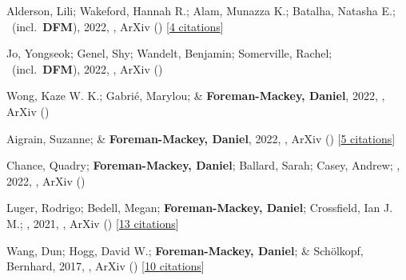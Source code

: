 \item[{\color{numcolor}\scriptsize10}] Alderson, Lili; Wakeford, Hannah R.; Alam, Munazza K.; Batalha, Natasha E.; \etal\ (incl.\ \textbf{DFM}), 2022, , ArXiv () [\href{https://ui.adsabs.harvard.edu/abs/2022arXiv221110488A}{4 citations}]

\item[{\color{numcolor}\scriptsize9}] Jo, Yongseok; Genel, Shy; Wandelt, Benjamin; Somerville, Rachel; \etal\ (incl.\ \textbf{DFM}), 2022, , ArXiv ()

\item[{\color{numcolor}\scriptsize8}] Wong, Kaze W. K.; Gabri{\'e}, Marylou; \& \textbf{Foreman-Mackey, Daniel}, 2022, , ArXiv ()

\item[{\color{numcolor}\scriptsize7}] Aigrain, Suzanne; \& \textbf{Foreman-Mackey, Daniel}, 2022, , ArXiv () [\href{https://ui.adsabs.harvard.edu/abs/2022arXiv220908940A}{5 citations}]

\item[{\color{numcolor}\scriptsize6}] Chance, Quadry; \textbf{Foreman-Mackey, Daniel}; Ballard, Sarah; Casey, Andrew; \etal, 2022, , ArXiv ()

\item[{\color{numcolor}\scriptsize5}] Luger, Rodrigo; Bedell, Megan; \textbf{Foreman-Mackey, Daniel}; Crossfield, Ian J. M.; \etal, 2021, , ArXiv () [\href{https://ui.adsabs.harvard.edu/abs/2021arXiv211006271L}{13 citations}]

\item[{\color{numcolor}\scriptsize4}] Wang, Dun; Hogg, David W.; \textbf{Foreman-Mackey, Daniel}; \& Sch{\"o}lkopf, Bernhard, 2017, , ArXiv () [\href{https://ui.adsabs.harvard.edu/abs/2017arXiv171002428W}{10 citations}]

